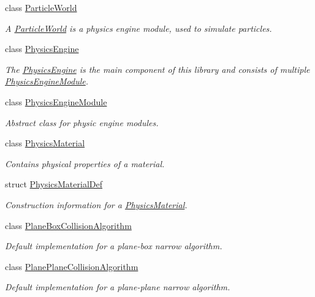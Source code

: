 \begin{DoxyCompactItemize}
class \mbox{\hyperlink{classr3_1_1_particle_world}{Particle\+World}}
\begin{DoxyCompactList}\small\item\em A \mbox{\hyperlink{classr3_1_1_particle_world}{Particle\+World}} is a physics engine module, used to simulate particles. \end{DoxyCompactList}\item 
class \mbox{\hyperlink{classr3_1_1_physics_engine}{Physics\+Engine}}
\begin{DoxyCompactList}\small\item\em The \mbox{\hyperlink{classr3_1_1_physics_engine}{Physics\+Engine}} is the main component of this library and consists of multiple \mbox{\hyperlink{classr3_1_1_physics_engine_module}{Physics\+Engine\+Module}}. \end{DoxyCompactList}\item 
class \mbox{\hyperlink{classr3_1_1_physics_engine_module}{Physics\+Engine\+Module}}
\begin{DoxyCompactList}\small\item\em Abstract class for physic engine modules. \end{DoxyCompactList}\item 
class \mbox{\hyperlink{classr3_1_1_physics_material}{Physics\+Material}}
\begin{DoxyCompactList}\small\item\em Contains physical properties of a material. \end{DoxyCompactList}\item 
struct \mbox{\hyperlink{structr3_1_1_physics_material_def}{Physics\+Material\+Def}}
\begin{DoxyCompactList}\small\item\em Construction information for a \mbox{\hyperlink{classr3_1_1_physics_material}{Physics\+Material}}. \end{DoxyCompactList}\item 
class \mbox{\hyperlink{classr3_1_1_plane_box_collision_algorithm}{Plane\+Box\+Collision\+Algorithm}}
\begin{DoxyCompactList}\small\item\em Default implementation for a plane-\/box narrow algorithm. \end{DoxyCompactList}\item 
class \mbox{\hyperlink{classr3_1_1_plane_plane_collision_algorithm}{Plane\+Plane\+Collision\+Algorithm}}
\begin{DoxyCompactList}\small\item\em Default implementation for a plane-\/plane narrow algorithm. \end{DoxyCompactList}\item 

\end{DoxyCompactItemize}
